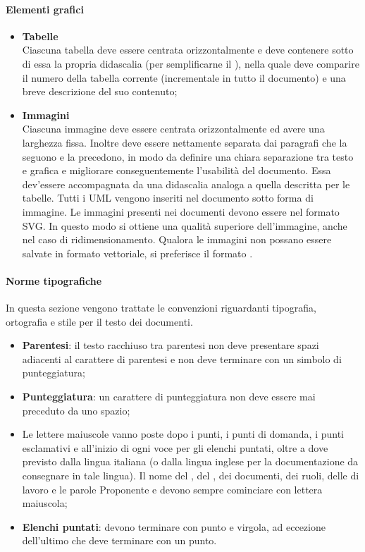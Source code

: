 \paragraph*{Elementi grafici}
\begin{itemize}
	\item \textbf{Tabelle} \\
		Ciascuna tabella deve essere centrata orizzontalmente e deve contenere sotto di essa la propria
		didascalia (per semplificarne il ), nella quale deve comparire il numero della tabella corrente (incrementale in tutto
		il documento) e una breve descrizione del suo contenuto;
	\item \textbf{Immagini} \\
		Ciascuna immagine deve essere centrata orizzontalmente ed avere una larghezza fissa. Inoltre deve
		essere nettamente separata dai paragrafi che la seguono e la precedono, in modo da definire una
		chiara separazione tra testo e grafica e migliorare conseguentemente l'usabilità del documento. Essa dev’essere
		accompagnata da una didascalia analoga a quella descritta per le tabelle. Tutti i 
		UML vengono inseriti nel documento sotto forma di immagine.
	        Le immagini presenti nei documenti devono essere nel formato SVG.
		In questo modo si ottiene una qualità superiore dell'immagine, anche nel caso di ridimensionamento. 
		Qualora le immagini non possano essere salvate in formato vettoriale, si preferisce il formato .

\end{itemize}

\paragraph*{Norme tipografiche}
In questa sezione vengono trattate le convenzioni riguardanti tipografia, ortografia e stile per il testo dei documenti. 
\begin{itemize}
\item \textbf{Parentesi}: il testo racchiuso tra parentesi non deve presentare spazi adiacenti al carattere di parentesi e non deve terminare con un simbolo di punteggiatura;
\item \textbf{Punteggiatura}: un carattere di punteggiatura non deve essere mai preceduto da uno spazio;
\item Le lettere maiuscole vanno poste dopo i punti, i punti di domanda, i punti esclamativi e all'inizio di ogni voce per gli elenchi puntati, oltre a dove previsto dalla lingua italiana (o dalla lingua inglese per la documentazione da consegnare in tale lingua). Il nome del , del , dei documenti, dei ruoli, delle  di lavoro e le parole Proponente e  devono sempre cominciare con lettera maiuscola;
  \item \textbf{Elenchi puntati}: devono terminare con punto e virgola, ad eccezione dell'ultimo che deve terminare con un punto.
\end{itemize}

